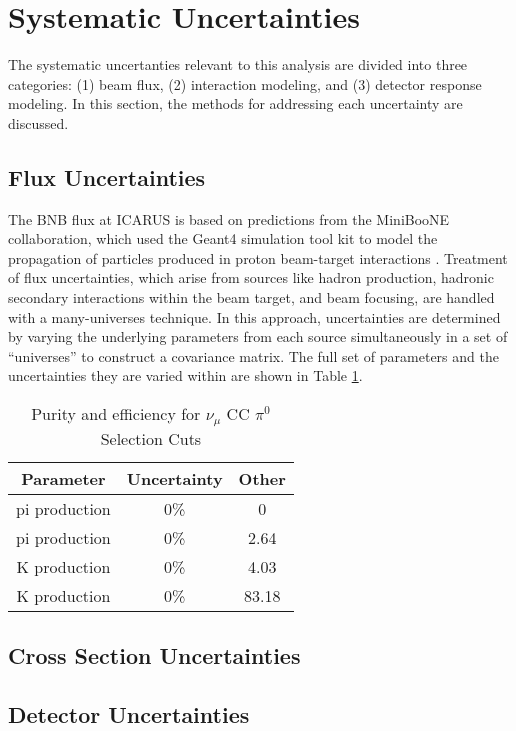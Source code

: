 \documentclass[../main.tex]{subfiles}
\begin{document}
\section{Systematic Uncertainties}
\label{sec:systs}
The systematic uncertanties relevant to this analysis are divided into three categories: (1) beam flux, (2) interaction modeling, and (3) detector response modeling.  In this section, the methods for addressing each uncertainty are discussed.

\subsection{Flux Uncertainties}
The BNB flux at ICARUS is based on predictions from the MiniBooNE collaboration, which used the Geant4 simulation tool kit to model the propagation of particles produced in proton beam-target interactions \cite{bnbflux}.  Treatment of flux uncertainties, which arise from sources like hadron production, hadronic secondary interactions within the beam target, and beam focusing, are handled with a many-universes technique.  In this approach, uncertainties are determined by varying the underlying parameters from each source simultaneously in a set of ``universes'' to construct a covariance matrix.  The full set of parameters and the uncertainties they are varied within are shown in Table \ref{Tab:fluxparameters}.

\begin{table}[ht]
    \caption{Purity and efficiency for $\nu_{\mu}$ CC $\pi^{0}$ Selection Cuts}
    \vspace{0.1cm}
    \centering
    \begin{tabular}{ c c c } 
    \hline
    Parameter & Uncertainty & Other \\
    \hline
    pi production & 0\% & 0 \\ 
    pi production & 0\% & 2.64 \\
    K production & 0\% & 4.03 \\
    K production & 0\% & 83.18 \\
    \hline
    \end{tabular}
    \label{Tab:fluxparameters}
\end{table}

\subsection{Cross Section Uncertainties}
\subsection{Detector Uncertainties}
\end{document}
